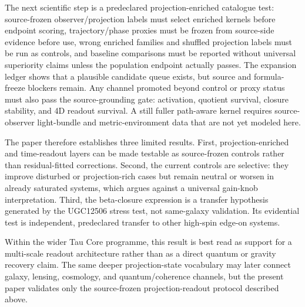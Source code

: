 \documentclass[11pt]{article}
\begin{document}
The next scientific step is a predeclared projection-enriched catalogue test:
source-frozen observer/projection labels must select enriched kernels before
endpoint scoring, trajectory/phase proxies must be frozen from source-side
evidence before use, wrong enriched families and shuffled projection labels
must be run as controls, and baseline comparisons must be reported without
universal superiority claims unless the population endpoint actually passes.
The expansion ledger shows that a plausible candidate queue exists, but source
and formula-freeze blockers remain.  Any channel promoted beyond control or
proxy status must also pass the source-grounding gate: activation, quotient
survival, closure stability, and 4D readout survival.  A still fuller
path-aware kernel requires source-observer light-bundle and metric-environment
data that are not yet modeled here.

The paper therefore establishes three limited results.  First,
projection-enriched and time-readout layers can be made testable as
source-frozen controls rather than residual-fitted corrections.  Second, the
current controls are selective: they improve disturbed or projection-rich cases
but remain neutral or worsen in already saturated systems, which argues against
a universal gain-knob interpretation.  Third, the beta-closure expression is a
transfer hypothesis generated by the UGC12506 stress test, not same-galaxy
validation.  Its evidential test is independent, predeclared transfer to other
high-spin edge-on systems.

Within the wider Tau Core programme, this result is best read as support for a
multi-scale readout architecture rather than as a direct quantum or gravity
recovery claim.  The same deeper projection-state vocabulary may later connect
galaxy, lensing, cosmology, and quantum/coherence channels, but the present
paper validates only the source-frozen projection-readout protocol described
above.




\end{document}
